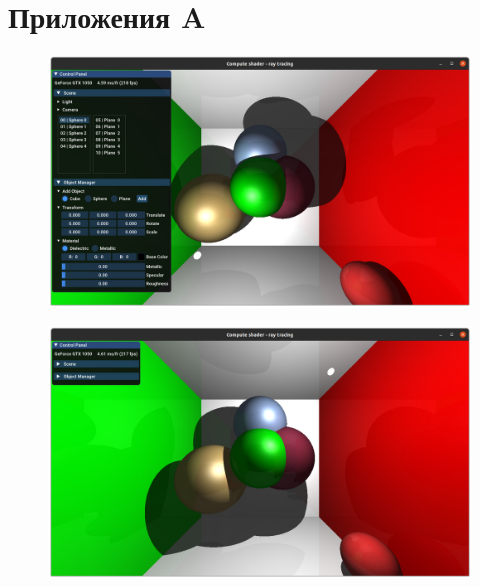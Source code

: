 \chapter*{Приложения A}

\begin{figure}[!ht]
\centering
\includegraphics[width=1\textwidth]{img/program_1.png}
\end{figure}

\begin{figure}[!ht]
\centering
\includegraphics[width=1\textwidth]{img/program_2.png}
\end{figure}